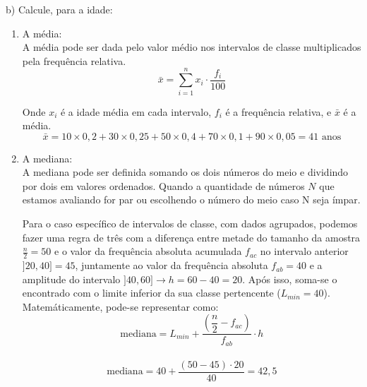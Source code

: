 b) Calcule, para a idade:
\\

\begin{enumerate}[label=(\roman*)]
    \item A média: \\

          A média pode ser dada pelo valor médio nos intervalos de classe multiplicados pela frequência relativa.
          \\

          \[
              \bar{x} = \sum_{i=1}^{n} x_i \cdot \frac{f_i}{100}
          \]

          Onde $x_i$ é a idade média em cada intervalo, $f_i$ é a frequência relativa, e $\bar{x}$ é a média.
          \\

          \begin{equation}
              \bar{x}= 10 \times 0,2+30\times 0,25+50\times 0,4+70\times 0,1+90\times 0,05 = 41 \text{ anos}
          \end{equation}

    \item A mediana: \\

          A mediana pode ser definida somando os dois números do meio e dividindo por dois em valores ordenados. Quando a quantidade de números $N$ que estamos avaliando for par ou escolhendo o número do meio caso N seja ímpar.

          Para o caso específico de intervalos de classe, com dados agrupados, podemos fazer uma regra de três com a diferença entre metade do tamanho da amostra $\frac{n}{2} = 50$ e o valor da frequência absoluta acumulada $f_{ac}$ no intervalo anterior $]20,40]=45$, juntamente ao valor da frequência absoluta $f_{ab}=40$ e a amplitude do intervalo $]40,60]\rightarrow h=60-40=20$. Após isso, soma-se o encontrado com o limite inferior da sua classe pertencente ($L_{min}=40$). Matemáticamente, pode-se representar como:
          \\

          \[
              \text{mediana} = L_{min} + \frac{\left(\dfrac{n}{2}-f_{ac}\right)}{f_{ab}}\cdot h
          \]
          \\

          \begin{equation}
              \text{mediana} = 40 + \frac{(50-45)\cdot 20}{40} = 42,5
          \end{equation}


\end{enumerate}
